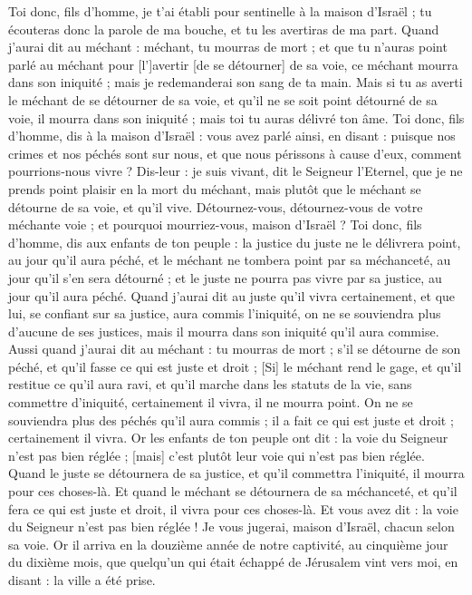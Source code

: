 \begin{multicols}{2}
Toi donc, fils d'homme, je t'ai établi pour sentinelle à la maison d'Israël ; tu écouteras donc la parole de ma bouche, et tu les avertiras de ma part.
Quand j'aurai dit au méchant : méchant, tu mourras de mort ; et que tu n'auras point parlé au méchant pour [l']avertir [de se détourner] de sa voie, ce méchant mourra dans son iniquité ; mais je redemanderai son sang de ta main.
Mais si tu as averti le méchant de se détourner de sa voie, et qu'il ne se soit point détourné de sa voie, il mourra dans son iniquité ; mais toi tu auras délivré ton âme.
Toi donc, fils d'homme, dis à la maison d'Israël : vous avez parlé ainsi, en disant : puisque nos crimes et nos péchés sont sur nous, et que nous périssons à cause d'eux, comment pourrions-nous vivre ?
Dis-leur : je suis vivant, dit le Seigneur l'Eternel, que je ne prends point plaisir en la mort du méchant, mais plutôt que le méchant se détourne de sa voie, et qu'il vive. Détournez-vous, détournez-vous de votre méchante voie ; et pourquoi mourriez-vous, maison d'Israël ?
Toi donc, fils d'homme, dis aux enfants de ton peuple : la justice du juste ne le délivrera point, au jour qu'il aura péché, et le méchant ne tombera point par sa méchanceté, au jour qu'il s'en sera détourné ; et le juste ne pourra pas vivre par sa justice, au jour qu'il aura péché.
Quand j'aurai dit au juste qu'il vivra certainement, et que lui, se confiant sur sa justice, aura commis l'iniquité, on ne se souviendra plus d'aucune de ses justices, mais il mourra dans son iniquité qu'il aura commise.
Aussi quand j'aurai dit au méchant : tu mourras de mort ; s'il se détourne de son péché, et qu'il fasse ce qui est juste et droit ;
[Si] le méchant rend le gage, et qu'il restitue ce qu'il aura ravi, et qu'il marche dans les statuts de la vie, sans commettre d'iniquité, certainement il vivra, il ne mourra point.
On ne se souviendra plus des péchés qu'il aura commis ; il a fait ce qui est juste et droit ; certainement il vivra.
Or les enfants de ton peuple ont dit : la voie du Seigneur n'est pas bien réglée ; [mais] c'est plutôt leur voie qui n'est pas bien réglée.
Quand le juste se détournera de sa justice, et qu'il commettra l'iniquité, il mourra pour ces choses-là.
Et quand le méchant se détournera de sa méchanceté, et qu'il fera ce qui est juste et droit, il vivra pour ces choses-là.
Et vous avez dit : la voie du Seigneur n'est pas bien réglée ! Je vous jugerai, maison d'Israël, chacun selon sa voie.
Or il arriva en la douzième année de notre captivité, au cinquième jour du dixième mois, que quelqu'un qui était échappé de Jérusalem vint vers moi, en disant : la ville a été prise.

\end{multicols}
